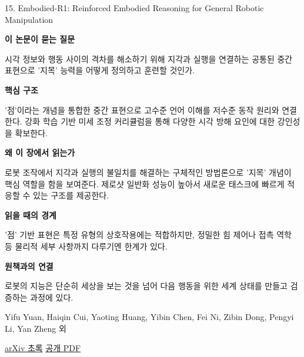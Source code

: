 \documentclass[11pt,openany]{book}
\begin{document}
\begin{termcard}{15. Embodied-R1: Reinforced Embodied Reasoning for General Robotic Manipulation}

\par

\medskip

{\sffamily\bfseries\color{deepblue} 이 논문이 묻는 질문}\par

시각 정보와 행동 사이의 격차를 해소하기 위해 지각과 실행을 연결하는 공통된 중간 표현으로 '지목' 능력을 어떻게 정의하고 훈련할 것인가.

\smallskip

{\sffamily\bfseries\color{deepblue} 핵심 구조}\par

'점'이라는 개념을 통합한 중간 표현으로 고수준 언어 이해를 저수준 동작 원리와 연결한다. 강화 학습 기반 미세 조정 커리큘럼을 통해 다양한 시각 방해 요인에 대한 강인성을 확보한다.

\smallskip

{\sffamily\bfseries\color{deepblue} 왜 이 장에서 읽는가}\par

로봇 조작에서 지각과 실행의 불일치를 해결하는 구체적인 방법론으로 '지목' 개념이 핵심 역할을 함을 보여준다. 제로샷 일반화 성능이 높아서 새로운 태스크에 빠르게 적응할 수 있는 구조를 제공한다.

\smallskip

{\sffamily\bfseries\color{coral} 읽을 때의 경계}\par

'점' 기반 표현은 특정 유형의 상호작용에는 적합하지만, 정밀한 힘 제어나 접촉 역학 등 물리적 세부 사항까지 다루기엔 한계가 있다.

\smallskip

{\sffamily\bfseries\color{teal} 원책과의 연결}\par

로봇의 지능은 단순히 세상을 보는 것을 넘어 다음 행동을 위한 세계 상태를 만들고 검증하는 과정에 있다.

\medskip

{\footnotesize\color{muted} Yifu Yuan, Haiqin Cui, Yaoting Huang, Yibin Chen, Fei Ni, Zibin Dong, Pengyi Li, Yan Zheng 외\par

\href{https://arxiv.org/abs/2508.13998}{arXiv 초록} \quad \href{https://arxiv.org/pdf/2508.13998}{공개 PDF}\par}

\end{termcard}
\end{document}
